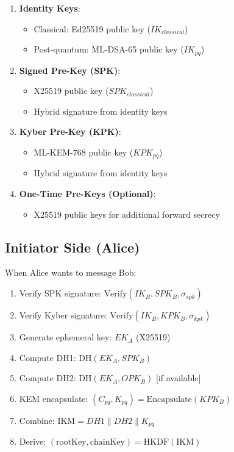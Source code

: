 \documentclass[12pt,a4paper]{article}
\begin{document}
\begin{enumerate}
    \item \textbf{Identity Keys}:
    \begin{itemize}
        \item Classical: Ed25519 public key ($IK_{classical}$)
        \item Post-quantum: ML-DSA-65 public key ($IK_{pq}$)
    \end{itemize}
    \item \textbf{Signed Pre-Key (SPK)}:
    \begin{itemize}
        \item X25519 public key ($SPK_{classical}$)
        \item Hybrid signature from identity keys
    \end{itemize}
    \item \textbf{Kyber Pre-Key (KPK)}:
    \begin{itemize}
        \item ML-KEM-768 public key ($KPK_{pq}$)
        \item Hybrid signature from identity keys
    \end{itemize}
    \item \textbf{One-Time Pre-Keys (Optional)}:
    \begin{itemize}
        \item X25519 public keys for additional forward secrecy
    \end{itemize}
\end{enumerate}

\subsection{Initiator Side (Alice)}

When Alice wants to message Bob:

\begin{enumerate}
    \item Verify SPK signature: $\text{Verify}(IK_B, SPK_B, \sigma_{spk})$
    \item Verify Kyber signature: $\text{Verify}(IK_B, KPK_B, \sigma_{kpk})$
    \item Generate ephemeral key: $EK_A$ (X25519)
    \item Compute DH1: $\text{DH}(EK_A, SPK_B)$
    \item Compute DH2: $\text{DH}(EK_A, OPK_B)$ [if available]
    \item KEM encapsulate: $(C_{pq}, K_{pq}) = \text{Encapsulate}(KPK_B)$
    \item Combine: $\text{IKM} = DH1 \| DH2 \| K_{pq}$
    \item Derive: $(\text{rootKey}, \text{chainKey}) = \text{HKDF}(\text{IKM})$
\end{enumerate}
\end{document}
